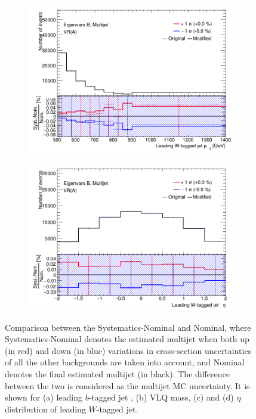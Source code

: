 \begin{figure}[hbt!]
	\begin{subfigure}{.35\textwidth}
		\centering
		\includegraphics[width=\linewidth,height=\textheight,keepaspectratio]{VR_B_ljet_pt_Multijets.png}
		\caption{}
		\label{fig:uncertainties:systematics:crossection:ljetpt}
	\end{subfigure}\hspace{0.6cm}
	\begin{subfigure}{.35\textwidth}
		\centering
		\includegraphics[width=\linewidth,height=\textheight,keepaspectratio]{VR_B_ljet_eta_Multijets.png}
		\caption{}
		\label{fig:uncertainties:systematics:crossection:ljeteta}
	\end{subfigure}
	\caption{Comparison between the Systematics-Nominal and Nominal, where Systematics-Nominal denotes the estimated multijet when both up (in red) and down (in blue) variations in cross-section uncertainties of all the other backgrounds are taken into account, and Nominal denotes the final estimated multijet (in black). The difference between the two is considered as the multijet MC  uncertainty. It is shown for (a) leading $b$-tagged jet \pt, (b) VLQ mass, (c) \pt and (d) $\eta$ distribution of leading $W$-tagged jet.}
	\label{fig:uncertainties:systematics:crossection}
\end{figure}


